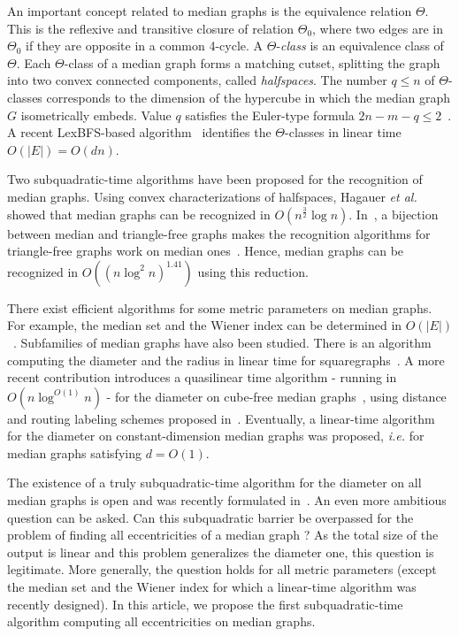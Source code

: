 \documentclass[a4paper,UKenglish,numberwithinsect,cleveref, autoref,anonymous]{lipics-v2021}
\newcommand{\card}[1]{\left| #1 \right|}
\begin{document}
An important concept related to median graphs is the equivalence relation $\Theta$. This is the reflexive and transitive closure of relation $\Theta_0$, where two edges are in $\Theta_0$ if they are opposite in a common 4-cycle. A $\Theta$-\textit{class} is an equivalence class of $\Theta$. Each $\Theta$-class of a median graph forms a matching cutset, splitting the graph into two convex connected components, called \textit{halfspaces}. The number $q \le n$ of $\Theta$-classes corresponds to the dimension of the hypercube in which the median graph $G$ isometrically embeds.  Value $q$ satisfies the Euler-type formula $2n-m-q\le 2$~\cite{KlMuSk98}. A recent LexBFS-based algorithm~\cite{BeChChVa20} identifies the $\Theta$-classes in linear time $O(\card{E})=O(dn)$.

Two subquadratic-time algorithms have been proposed for the recognition of median graphs. Using convex characterizations of halfspaces, Hagauer {\em et al.}~\cite{HaImKl99} showed that median graphs can be recognized in $O(n^{\frac{3}{2}}\log{n})$. In~\cite{ImKlMu99}, a bijection between median and triangle-free graphs makes the recognition algorithms for triangle-free graphs work on median ones~\cite{AlYuZw97}. Hence, median graphs can be recognized in $O((n\log^2 n)^{1.41})$ using this reduction.

There exist efficient algorithms for some metric parameters on median graphs. For example, the median set and the Wiener index can be determined in $O(\card{E})$~\cite{BeChChVa20}. 
Subfamilies of median graphs have also been studied. There is an algorithm computing the diameter and the radius in linear time for squaregraphs~\cite{ChDrVa02}. A more recent contribution introduces a quasilinear time algorithm - running in $O(n\log^{O(1)} n)$ - for the diameter on cube-free median graphs~\cite{Du20}, using distance and routing labeling schemes proposed in~\cite{ChLaRa19}. Eventually, a linear-time algorithm~\cite{BeHa21} for the diameter on constant-dimension median graphs was proposed, {\em i.e.} for median graphs satisfying $d=O(1)$.

The existence of a truly subquadratic-time algorithm for the diameter on all median graphs is open and was recently formulated in~\cite{BeChChVa20,BeHa21,Du20}. An even more ambitious question can be asked. Can this subquadratic barrier be overpassed for the problem of finding all eccentricities of a median graph ? As the total size of the output is linear and this problem generalizes the diameter one, this question is legitimate. More generally, the question holds for all metric parameters (except the median set and the Wiener index for which a linear-time algorithm was recently designed). In this article, we propose the first subquadratic-time algorithm computing all eccentricities on median graphs. 
\end{document}
